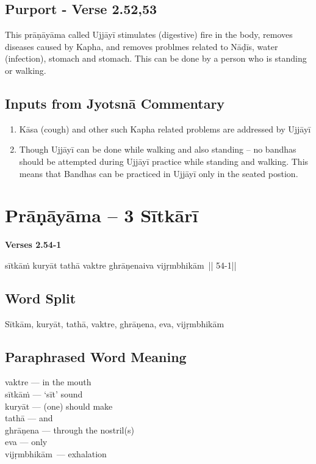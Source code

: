 \subsection*{Purport - Verse 2.52,53}


This prāṇāyāma called Ujjāyī stimulates (digestive) fire in the body, removes diseases caused by Kapha, and removes problmes related to Nāḍīs, water (infection), stomach and stomach. This can be done by a person who is standing or walking.

\subsection*{Inputs from Jyotsnā Commentary}


\begin{enumerate}
\item Kāsa (cough) and other such Kapha related problems are addressed by Ujjāyī 
\item Though Ujjāyī can be done while walking and also standing – no bandhas should be attempted during Ujjāyī practice while standing and walking. This means that Bandhas can be practiced in Ujjāyī only in the seated postion. 
\end{enumerate}
\newpage

\section*{Prāṇāyāma -- 3 Sītkārī}

\noindent \textbf{Verses 2.54-1 }

\begin{center}
sītkāṁ kuryāt tathā vaktre ghrāṇenaiva vijṛmbhikām || 54-1||
\end{center}

\subsection*{Word Split}


Sītkām, kuryāt, tathā, vaktre, ghrāṇena, eva, vijṛmbhikām

\subsection*{Paraphrased Word Meaning}


\begin{multicols}{2}
vaktre --- in the mouth \\
sītkāṁ --- ‘sīt’ sound \\
kuryāt --- (one) should make \\
tathā  --- and \\
ghrāṇena --- through the nostril(s)\\
eva --- only \\
vijṛmbhikām --- exhalation
\end{multicols}

